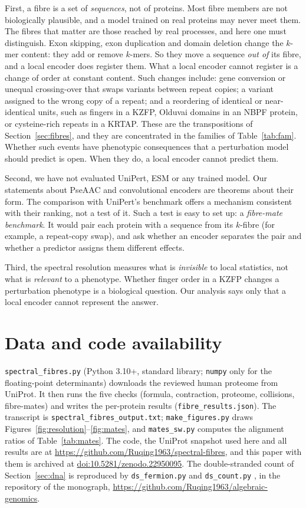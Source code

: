 \documentclass[11pt]{article}
\theoremstyle{plain}
\theoremstyle{definition}
\theoremstyle{remark}
\begin{document}
First, a fibre is a set of \emph{sequences}, not of proteins. Most fibre members are not
biologically plausible, and a model trained on real proteins may never meet them. The fibres that
matter are those reached by real processes, and here one must distinguish. Exon skipping, exon
duplication and domain deletion change the $k$-mer content: they add or remove $k$-mers. So they
move a sequence \emph{out of} its fibre, and a local encoder does register them. What a local encoder
cannot register is a change of order at constant content. Such changes include: gene conversion or
unequal crossing-over that swaps variants between repeat copies; a variant assigned to the wrong copy
of a repeat; and a reordering of identical or near-identical units, such as fingers in a KZFP, Olduvai
domains in an NBPF protein, or cysteine-rich repeats in a KRTAP. These are the transpositions of
Section~\ref{sec:fibres}, and they are concentrated in the families of Table~\ref{tab:fam}. Whether
such events have phenotypic consequences that a perturbation model should predict is open. When they
do, a local encoder cannot predict them.

Second, we have not evaluated UniPert, ESM or any trained model. Our statements about PseAAC and
convolutional encoders are theorems about their form. The comparison with UniPert's benchmark offers
a mechanism consistent with their ranking, not a test of it. Such a test is easy to set up: a
\emph{fibre-mate benchmark}. It would pair each protein with a sequence from its $k$-fibre (for
example, a repeat-copy swap), and ask whether an encoder separates the pair and whether a predictor
assigns them different effects.

Third, the spectral resolution measures what is \emph{invisible} to local statistics, not what is
\emph{relevant} to a phenotype. Whether finger order in a KZFP changes a perturbation phenotype is a
biological question. Our analysis says only that a local encoder cannot represent the answer.

\section*{Data and code availability}
\texttt{spectral\_fibres.py} (Python 3.10+, standard library; \texttt{numpy} only for the
floating-point determinants) downloads the reviewed human proteome from UniProt. It then runs the
five checks (formula, contraction, proteome, collisions, fibre-mates) and writes the per-protein
results (\texttt{fibre\_results.json}). The transcript is \texttt{spectral\_fibres\_output.txt};
\texttt{make\_figures.py} draws Figures~\ref{fig:resolution}--\ref{fig:mates}, and \texttt{mates\_sw.py}
computes the alignment ratios of Table~\ref{tab:mates}. The code, the UniProt snapshot used here
and all results are at \url{https://github.com/Ruqing1963/spectral-fibres}, and this paper with
them is archived at \href{https://doi.org/10.5281/zenodo.22950095}{doi:10.5281/zenodo.22950095}. The
double-stranded count of Section~\ref{sec:dna} is reproduced by \texttt{ds\_fermion.py} and
\texttt{ds\_count.py} \cite[Ch.~9]{AG}, in the repository of the monograph,
\url{https://github.com/Ruqing1963/algebraic-genomics}.
\end{document}
